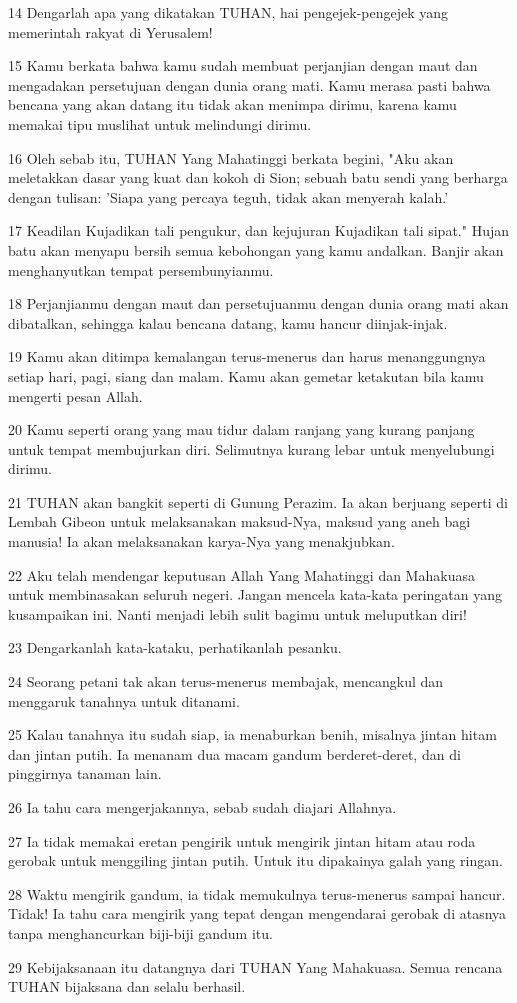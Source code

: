 \par 14 Dengarlah apa yang dikatakan TUHAN, hai pengejek-pengejek yang memerintah rakyat di Yerusalem!
\par 15 Kamu berkata bahwa kamu sudah membuat perjanjian dengan maut dan mengadakan persetujuan dengan dunia orang mati. Kamu merasa pasti bahwa bencana yang akan datang itu tidak akan menimpa dirimu, karena kamu memakai tipu muslihat untuk melindungi dirimu.
\par 16 Oleh sebab itu, TUHAN Yang Mahatinggi berkata begini, "Aku akan meletakkan dasar yang kuat dan kokoh di Sion; sebuah batu sendi yang berharga dengan tulisan: 'Siapa yang percaya teguh, tidak akan menyerah kalah.'
\par 17 Keadilan Kujadikan tali pengukur, dan kejujuran Kujadikan tali sipat." Hujan batu akan menyapu bersih semua kebohongan yang kamu andalkan. Banjir akan menghanyutkan tempat persembunyianmu.
\par 18 Perjanjianmu dengan maut dan persetujuanmu dengan dunia orang mati akan dibatalkan, sehingga kalau bencana datang, kamu hancur diinjak-injak.
\par 19 Kamu akan ditimpa kemalangan terus-menerus dan harus menanggungnya setiap hari, pagi, siang dan malam. Kamu akan gemetar ketakutan bila kamu mengerti pesan Allah.
\par 20 Kamu seperti orang yang mau tidur dalam ranjang yang kurang panjang untuk tempat membujurkan diri. Selimutnya kurang lebar untuk menyelubungi dirimu.
\par 21 TUHAN akan bangkit seperti di Gunung Perazim. Ia akan berjuang seperti di Lembah Gibeon untuk melaksanakan maksud-Nya, maksud yang aneh bagi manusia! Ia akan melaksanakan karya-Nya yang menakjubkan.
\par 22 Aku telah mendengar keputusan Allah Yang Mahatinggi dan Mahakuasa untuk membinasakan seluruh negeri. Jangan mencela kata-kata peringatan yang kusampaikan ini. Nanti menjadi lebih sulit bagimu untuk meluputkan diri!
\par 23 Dengarkanlah kata-kataku, perhatikanlah pesanku.
\par 24 Seorang petani tak akan terus-menerus membajak, mencangkul dan menggaruk tanahnya untuk ditanami.
\par 25 Kalau tanahnya itu sudah siap, ia menaburkan benih, misalnya jintan hitam dan jintan putih. Ia menanam dua macam gandum berderet-deret, dan di pinggirnya tanaman lain.
\par 26 Ia tahu cara mengerjakannya, sebab sudah diajari Allahnya.
\par 27 Ia tidak memakai eretan pengirik untuk mengirik jintan hitam atau roda gerobak untuk menggiling jintan putih. Untuk itu dipakainya galah yang ringan.
\par 28 Waktu mengirik gandum, ia tidak memukulnya terus-menerus sampai hancur. Tidak! Ia tahu cara mengirik yang tepat dengan mengendarai gerobak di atasnya tanpa menghancurkan biji-biji gandum itu.
\par 29 Kebijaksanaan itu datangnya dari TUHAN Yang Mahakuasa. Semua rencana TUHAN bijaksana dan selalu berhasil.

